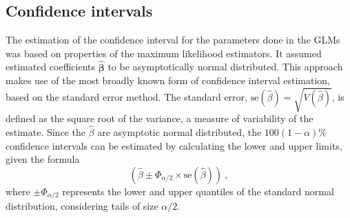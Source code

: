 \subsection{Confidence intervals} \label{seq:confint}

The estimation of the confidence interval for the parameters done in the GLMs was based on properties of the maximum likelihood estimators.
It assumed estimated coefficients $\widehat{{\boldsymbol{\beta}}}$ to be asymptotically normal distributed.
This approach makes use of the most broadly known form of confidence interval estimation, based on the standard error method.
The standard error, $\textstyle\text{se}(\widehat{{\beta}})=\sqrt{V(\widehat{\beta})}$, is defined as the square root of the variance, a measure of variability of the estimate.
Since the $\widehat{\beta}$ are asymptotic normal distributed, the $100(1-\alpha)$\% confidence intervals can be estimated by calculating the lower and upper limits, given the formula
%
\begin{equation}
    \left(\widehat{\beta}\pm \Phi_{\alpha/2} \times \text{se}({\widehat{\beta}})  \right)\ ,
    \label{eq:betas.ci}
\end{equation}
%
\noindent
where $\pm \Phi_{\alpha/2}$ represents the lower and upper quantiles of the standard normal distribution, considering tails of size $\alpha/2$.

